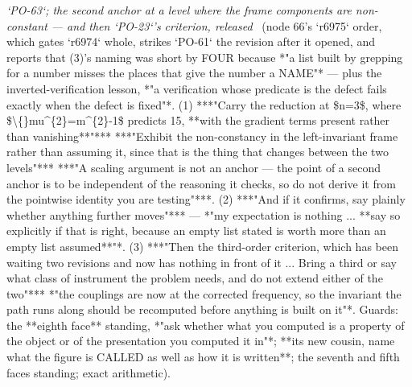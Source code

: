 \begin{description}
\textit{`PO-63`; the second anchor at a level where the frame components are non-constant --- and then `PO-23`'s criterion, released} \ (node 66's `r6975` order, which gates `r6974` whole, strikes `PO-61` the revision after it opened, and reports that (3)'s naming was short by FOUR because *"a list built by grepping for a number misses the places that give the number a NAME"* --- plus the inverted-verification lesson, *"a verification whose predicate is the defect fails exactly when the defect is fixed"*. (1) ***"Carry the reduction at \$n=3\$, where \$\textbackslash\{\}mu\textasciicircum{}\{2\}=m\textasciicircum{}\{2\}-1\$ predicts 15, **with the gradient terms present rather than vanishing**"***  ***"Exhibit the non-constancy in the left-invariant frame rather than assuming it, since that is the thing that changes between the two levels"***  ***"A scaling argument is not an anchor --- the point of a second anchor is to be independent of the reasoning it checks, so do not derive it from the pointwise identity you are testing"***. (2) ***"And if it confirms, say plainly whether anything further moves"*** --- *"my expectation is nothing ... **say so explicitly if that is right, because an empty list stated is worth more than an empty list assumed**"*. (3) ***"Then the third-order criterion, which has been waiting two revisions and now has nothing in front of it ... Bring a third or say what class of instrument the problem needs, and do not extend either of the two"***  *"the couplings are now at the corrected frequency, so the invariant the path runs along should be recomputed before anything is built on it"*.  Guards: the **eighth face** standing, *"ask whether what you computed is a property of the object or of the presentation you computed it in"*; **its new cousin, name what the figure is CALLED as well as how it is written**; the seventh and fifth faces standing; exact arithmetic). 

\end{description}
